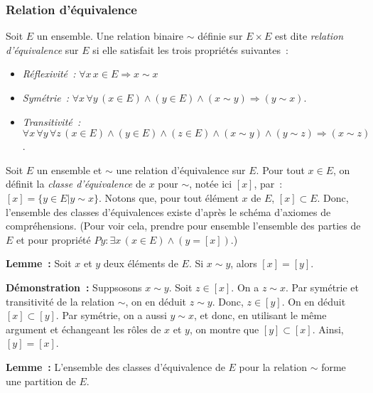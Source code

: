 \subsubsection{Relation d'équivalence}

Soit $E$ un ensemble. 
Une relation binaire $\sim$ définie sur $E \times E$ est dite \textit{relation d'équivalence} sur $E$ si elle satisfait les trois propriétés suivantes : 
\begin{itemize}[nosep]
    \item \textit{Réflexivité :} $\forall x \, x \in E \Rightarrow x \sim x$
    \item \textit{Symétrie :} $\forall x \, \forall y \, (x \in E) \wedge (y \in E) \wedge (x \sim y) \Rightarrow (y \sim x)$.
    \item \textit{Transitivité :} $\forall x \, \forall y \, \forall z \, (x \in E) \wedge (y \in E) \wedge (z \in E) \wedge (x \sim y) \wedge (y \sim z) \Rightarrow (x \sim z)$. 
\end{itemize}

Soit $E$ un ensemble et $\sim$ une relation d'équivalence sur $E$. 
Pour tout $x \in E$, on définit la \textit{classe d'équivalence} de $x$ pour $\sim$, notée ici $[x]$, par : $[x] = \lbrace y \in E \vert y \sim x \rbrace$. 
Notons que, pour tout élément $x$ de $E$, $[x] \subset E$. 
Donc, l'ensemble des classes d'équivalences existe d'après le schéma d'axiomes de compréhensions. 
(Pour voir cela, prendre pour ensemble l'ensemble des parties de $E$ et pour propriété $P y: \exists x \, (x \in E) \wedge (y = [x])$.)

\medskip

\noindent \textbf{Lemme :} Soit $x$ et $y$ deux éléments de $E$. Si $x \sim y$, alors $[x] = [y]$. 

\medskip

\noindent \textbf{Démonstration :} 
    Suppsosons $x \sim y$. Soit $z \in [x]$. On a $z \sim x$. Par symétrie et transitivité de la relation $\sim$, on en déduit $z \sim y$. Donc, $z \in [y]$. 
    On en déduit $[x] \subset [y]$.
    Par symétrie, on a aussi $y \sim x$, et donc, en utilisant le même argument et échangeant les rôles de $x$ et $y$, on montre que $[y] \subset [x]$. 
    Ainsi, $[y] = [x]$.

\done

\medskip

\noindent \textbf{Lemme :} L'ensemble des classes d'équivalence de $E$ pour la relation $\sim$ forme une partition de $E$.

\medskip

